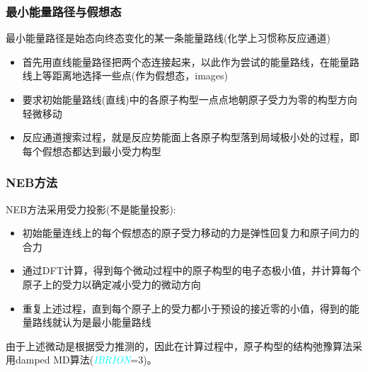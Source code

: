 \frame
{
	\frametitle{最小能量路径与假想态}
	最小能量路径是始态向终态变化的某一条能量路线(化学上习惯称反应通道)%
	\begin{itemize}
		\item 首先用直线能量路径把两个态连接起来，以此作为尝试的能量路线，在能量路线上等距离地选择一些点(作为假想态，\textrm{images})\\%
			{\fontsize{7.2pt}{5.2pt}\selectfont{注意每个假想态表示的是反应过程中的一个特定的中间构型，假想态的数目则依赖于能量路线的复杂性}}%
		\item 要求初始能量路线(直线)中的各原子构型一点点地朝原子受力为零的构型方向轻微移动\\%
			{\fontsize{7.2pt}{5.2pt}\selectfont{为控制能量路线的移动，对能量路线上的等间距分布的假想态施加沿特定方向的弹性应力，确保能量路线连续地朝最小能量路径方向过渡}}%
		\item 反应通道搜索过程，就是反应势能面上各原子构型落到局域极小处的过程，即每个假想态都达到最小受力构型%
	\end{itemize}
}

\frame
{
	\frametitle{\textrm{NEB}方法}
\textrm{NEB}方法采用受力投影(不是能量投影):
\vskip 3pt
{\fontsize{7.2pt}{5.2pt}}
\begin{itemize}
	\item 初始能量连线上的每个假想态的原子受力移动的力是弹性回复力和原子间力的合力\\
		{\fontsize{7.2pt}{5.2pt}\selectfont{为了将初始能量路线直接推向最小能量路线，只考虑沿能量路线(该点切线)的弹性回复力投影和垂直能量路线(法线)的原子间作用力投影，而忽略其余力的贡献}}
	\item 通过\textrm{DFT}计算，得到每个微动过程中的原子构型的电子态极小值，并计算每个原子上的受力以确定减小受力的微动方向\\
		{\fontsize{7.2pt}{5.2pt}\selectfont{初始能量路线将会向最小能量路线移动}}
	\item 重复上述过程，直到每个原子上的受力都小于预设的接近零的小值，得到的能量路线就认为是最小能量路线
\end{itemize}
由于上述微动是根据受力推测的，因此在计算过程中，原子构型的结构弛豫算法采用\textrm{damped MD}算法(\textcolor{cyan}{\textit{IBRION}}=3)。
}


